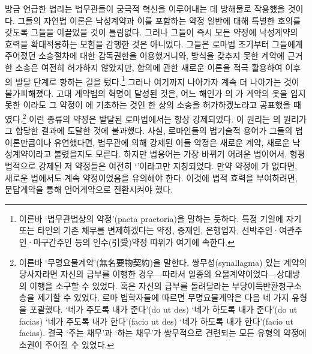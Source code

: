 방금 언급한 법리는 법무관들이 궁극적 혁신을 이루어내는 데
방해물로 작용했을 것이다.
그들의 자연법 이론은
낙성계약과 이를 포함하는 약정 일반에 대해
특별한 호의를 갖도록 그들을 이끌었을 것이 틀림없다.
그러나 그들이 즉시
모든 약정에 낙성계약의 효력을 확대적용하는 모험을 감행한 것은 아니었다.
그들은 로마법 초기부터 그들에게 주어졌던
소송절차에 대한 감독권한을 이용했거니와,
방식을 갖추지 못한 계약에 근거한 소송은 여전히 허가하지 않았지만,
합의에 관한 새로운 이론을 적극 활용하여
이후의 발달 단계로 향하는 길을 텄다.\footnote{%
  이른바 `법무관법상의 약정'(pacta praetoria)을 말하는 듯하다.
  특정 기일에 자기 또는 타인의 기존 채무를 변제하겠다는 약정,
  중재인, 은행업자, 선박주인^^b7여관주인^^b7마구간주인 등의 인수(引受)약정
  따위가 여기에 속한다. }
그러나
여기까지 나아가자
계속 더 나아가는 것이 불가피해졌다.
고대 계약법의 혁명이 달성된 것은,
어느 해인가 의 가
계약의 옷을 입지 못한 이라도
그 약정이 에
기초하는 것인 한
상의 소송을 허가하겠노라고 공표했을 때였다.\footnote{%
  이른바 `무명요물계약'(無名要物契約)을 말한다.
  쌍무성(synallagma) 있는 계약의 당사자라면
  자신의 급부를 이행한 경우---따라서 일종의 요물계약이었다---상대방의
  이행을 소구할 수 있었다.
  혹은 자신의 급부를 돌려달라는 부당이득반환청구소송을 제기할 수 있었다.
  로마 법학자들에 따르면 무명요물계약은 다음 네 가지 유형을 포괄했다.
  `네가 주도록 내가 준다'(do ut des)
  `네가 하도록 내가 준다'(do ut facias)
  `네가 주도록 내가 한다'(facio ut des)
  `네가 하도록 내가 한다'(facio ut facias).
  결국 `주는 채무'과 `하는 채무'가 쌍무적으로 견련되는 모든 유형의 약정에
  소권이 주어질 수 있었다.
   }
이런 종류의 약정은 발달된 로마법에서는 항상 강제되었다.
이 원리는
의 원리가 그 합당한 결과에 도달한 것에 불과했다.
사실, 로마인들의 법기술적 용어가 그들의 법이론만큼이나 유연했다면,
법무관에 의해 강제된 이들 약정은
새로운 계약, 새로운 낙성계약이라고 불렸을지도 모른다.
하지만 법용어는 가장 바뀌기 어려운 법이어서,
형평법적으로 강제된 저 약정들은
여전히 `'이라고만 지칭되었다.
만약 약정에 가 없다면,
%
새로운 법에서도 계속 약정이었음을
유의해야 한다.
이것에 법적 효력을 부여하려면,
문답계약을 통해 언어계약으로 전환시켜야 했다.


